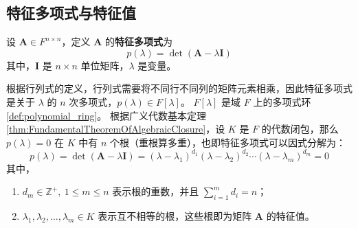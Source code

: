 \vspace{1em}

\subsection{特征多项式与特征值}

\begin{definition}
    设 $\mathbf{A} \in F^{n \times n}$，定义 $\mathbf{A}$ 的\textbf{特征多项式}为
    \begin{equation}
        p(\lambda) = \det(\mathbf{A} - \lambda \mathbf{I})
        \label{eq:characteristic_polynomial}
    \end{equation}
    其中，$\mathbf{I}$ 是 $n\times n$ 单位矩阵，$\lambda$ 是变量。
    \label{def:characteristic_polynomial}
\end{definition}

\begin{note}
    根据行列式的定义，行列式需要将不同行不同列的矩阵元素相乘，因此特征多项式是关于 $\lambda$ 的 $n$ 次多项式，$p(\lambda)\in F[\lambda]$。
    $F[\lambda]$ 是域 $F$ 上的多项式环 \ref{def:polynomial_ring}。
    根据广义代数基本定理 \ref{thm:FundamentalTheoremOfAlgebraicClosure}，设 $K$ 是 $F$ 的代数闭包，那么 $p(\lambda)=0$ 在 $K$ 中有 $n$ 个根（重根算多重），也即特征多项式可以因式分解为：
    \begin{equation}
        p(\lambda) = \det(\mathbf{A} - \lambda \mathbf{I}) = (\lambda-\lambda_1)^{d_1}(\lambda-\lambda_2)^{d_2}\cdots(\lambda-\lambda_m)^{d_m} =0
        \label{eq:characteristic_polynomial_factorization}
    \end{equation}
    其中，
    \begin{enumerate}
        \item $d_m\in \mathbb{Z}^+,\ 1 \leq m \leq n$ 表示根的重数，并且 $\sum_{i=1}^{m} d_i = n$；
        \item $\lambda_1,\lambda_2,\ldots,\lambda_m \in K$ 表示互不相等的根，这些根即为矩阵 $\mathbf{A}$ 的特征值。
    \end{enumerate}
\end{note}

